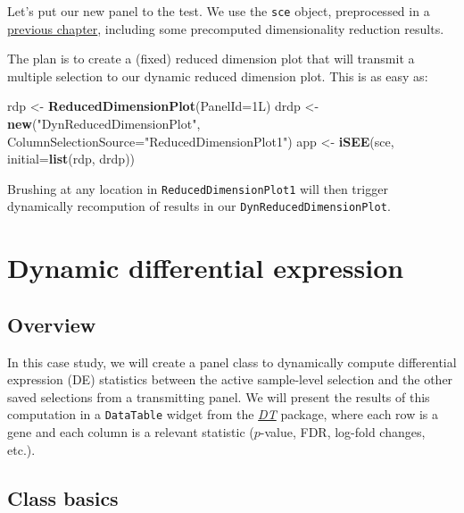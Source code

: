 \documentclass[]{book}
\newenvironment{Shaded}{\begin{snugshade}}{\end{snugshade}}
\newcommand{\KeywordTok}[1]{\textcolor[rgb]{0.13,0.29,0.53}{\textbf{#1}}}
\newcommand{\DataTypeTok}[1]{\textcolor[rgb]{0.13,0.29,0.53}{#1}}
\newcommand{\StringTok}[1]{\textcolor[rgb]{0.31,0.60,0.02}{#1}}
\newcommand{\NormalTok}[1]{#1}
\begin{document}
Let's put our new panel to the test. We use the \texttt{sce} object,
preprocessed in a \protect\hyperlink{developing}{previous chapter},
including some precomputed dimensionality reduction results.

The plan is to create a (fixed) reduced dimension plot that will
transmit a multiple selection to our dynamic reduced dimension plot.
This is as easy as:

\begin{Shaded}
\begin{Highlighting}[]
\NormalTok{rdp <-}\StringTok{ }\KeywordTok{ReducedDimensionPlot}\NormalTok{(}\DataTypeTok{PanelId=}\NormalTok{1L)}
\NormalTok{drdp <-}\StringTok{ }\KeywordTok{new}\NormalTok{(}\StringTok{"DynReducedDimensionPlot"}\NormalTok{, }\DataTypeTok{ColumnSelectionSource=}\StringTok{"ReducedDimensionPlot1"}\NormalTok{)}
\NormalTok{app <-}\StringTok{ }\KeywordTok{iSEE}\NormalTok{(sce, }\DataTypeTok{initial=}\KeywordTok{list}\NormalTok{(rdp, drdp))}
\end{Highlighting}
\end{Shaded}

Brushing at any location in \texttt{ReducedDimensionPlot1} will then
trigger dynamically recompution of results in our
\texttt{DynReducedDimensionPlot}.

\chapter{Dynamic differential
expression}\label{dynamic-differential-expression}

\section{Overview}\label{overview-2}

In this case study, we will create a panel class to dynamically compute
differential expression (DE) statistics between the active sample-level
selection and the other saved selections from a transmitting panel. We
will present the results of this computation in a \texttt{DataTable}
widget from the \emph{\href{https://CRAN.R-project.org/package=DT}{DT}}
package, where each row is a gene and each column is a relevant
statistic (\(p\)-value, FDR, log-fold changes, etc.).

\section{Class basics}\label{class-basics-1}
\end{document}
